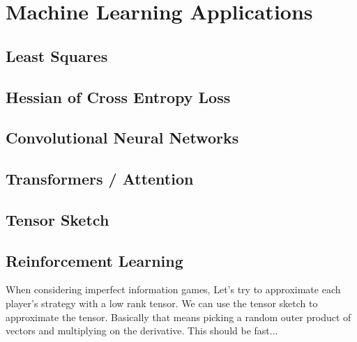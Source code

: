 
\chapter{Machine Learning Applications}

\section{Least Squares}

\section{Hessian of Cross Entropy Loss}

\section{Convolutional Neural Networks}

\section{Transformers / Attention}

\section{Tensor Sketch}

\section{Reinforcement Learning}

When considering imperfect information games,
Let's try to approximate each player's strategy with a low rank tensor.
We can use the tensor sketch to approximate the tensor.
Basically that means picking a random outer product of vectors and multiplying on the derivative.
This should be fast...
